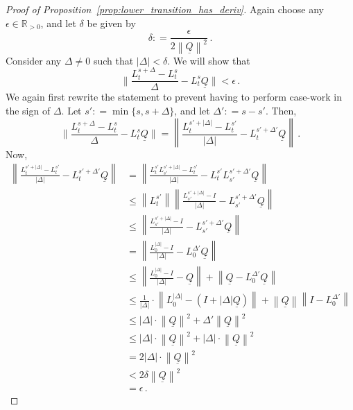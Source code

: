 \documentclass[10pt]{paper}
\theoremstyle{definition}
\newcommand{\reals}{\mathbb{R}}
\newcommand{\realspos}{\reals_{>0}}
\newcommand{\lbound}{L}
\newcommand{\lrate}{\underline{Q}}
\newcommand{\norm}[1]{\left\lVert #1 \right\rVert}
\newcommand{\coloneqq}{:\!=}
\begin{document}
\begin{proof}[Proof of Proposition~\ref{prop:lower_transition_has_deriv}]
Again choose any $\epsilon\in\realspos$, and let $\delta$ be given by
\begin{equation*}
\delta \coloneqq \frac{\epsilon}{2\norm{\lrate}^2}\,.
\end{equation*}
Consider any $\Delta\neq 0$ such that $\lvert\Delta\rvert<\delta$. We will show that
\begin{equation*}
\Big\lVert\frac{L_{t}^{s+\Delta}-L_t^s}{\Delta}-\lbound_t^s\lrate \Big\rVert<\epsilon\,.
\end{equation*}
We again first rewrite the statement to prevent having to perform case-work in the sign of $\Delta$. Let $s'\coloneqq\min\{s,s+\Delta\}$, and let $\Delta'\coloneqq s-s'$. Then,
\begin{equation*}
\Big\lVert\frac{L_{t}^{s+\Delta}-L_t^s}{\Delta}-\lbound_t^s\lrate \Big\rVert = \norm{\frac{L_t^{s'+\lvert\Delta\rvert} - L_t^{s'}}{\lvert\Delta\rvert} - L_t^{s'+\Delta'}\lrate}\,.
\end{equation*}
Now,
\begin{align*}
\norm{\frac{L_t^{s'+\lvert\Delta\rvert} - L_t^{s'}}{\lvert\Delta\rvert} - L_t^{s'+\Delta'}\lrate} &= \norm{\frac{L_t^{s'}L_{s'}^{s'+\lvert\Delta\rvert} - L_t^{s'}}{\lvert\Delta\rvert} - L_t^{s'}L_{s'}^{s'+\Delta'}\lrate} \\
 &\leq \norm{L_t^{s'}}\norm{\frac{L_{s'}^{s'+\lvert\Delta\rvert} - I}{\lvert\Delta\rvert} - L_{s'}^{s'+\Delta'}\lrate} \\
 &\leq \norm{\frac{L_{s'}^{s'+\lvert\Delta\rvert} - I}{\lvert\Delta\rvert} - L_{s'}^{s'+\Delta'}\lrate} \\
 &= \norm{\frac{L_{0}^{\lvert\Delta\rvert} - I}{\lvert\Delta\rvert} - L_{0}^{\Delta'}\lrate} \\
 &\leq \norm{\frac{L_{0}^{\lvert\Delta\rvert} - I}{\lvert\Delta\rvert} - \lrate} + \norm{\lrate - L_{0}^{\Delta'}\lrate} \\
 &\leq \frac{1}{\lvert\Delta\rvert}\cdot\norm{L_{0}^{\lvert\Delta\rvert} - (I+\lvert\Delta\rvert\lrate)} + \norm{\lrate}\norm{I - L_{0}^{\Delta'}} \\
 &\leq \lvert\Delta\rvert\cdot\norm{\lrate}^2 + \Delta'\norm{\lrate}^2 \\
 &\leq \lvert\Delta\rvert\cdot\norm{\lrate}^2 + \lvert\Delta\rvert\cdot\norm{\lrate}^2 \\
 &= 2\lvert\Delta\rvert\cdot\norm{\lrate}^2 \\
 &< 2\delta\norm{\lrate}^2 \\
 &= \epsilon\,.
\end{align*}
\end{proof}
\end{document}
